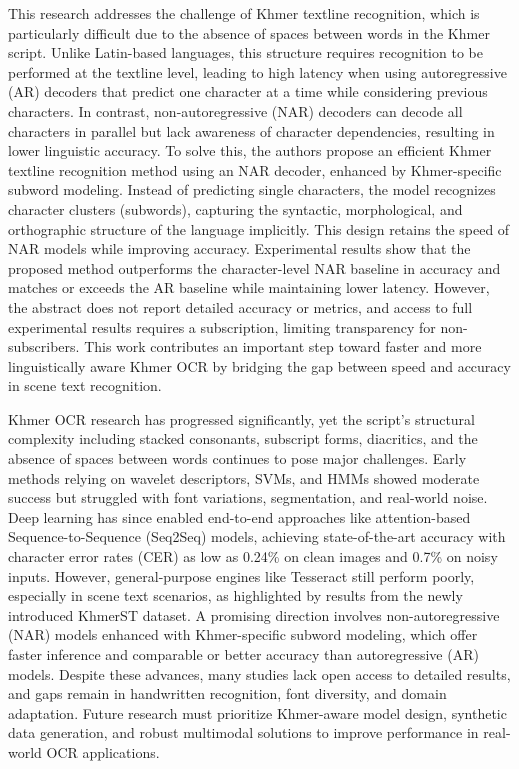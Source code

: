 \citet{Rina2025} This research addresses the challenge of Khmer textline recognition, 
which is particularly difficult due to the absence of spaces between words in the Khmer script. 
Unlike Latin-based languages, this structure requires recognition to be performed at the textline level, 
leading to high latency when using autoregressive (AR) decoders that predict one character at a 
time while considering previous characters. In contrast, non-autoregressive (NAR) decoders can decode 
all characters in parallel but lack awareness of character dependencies, resulting in lower linguistic 
accuracy. To solve this, the authors propose an efficient Khmer textline recognition method using an NAR 
decoder, enhanced by Khmer-specific subword modeling. Instead of predicting single characters, the model 
recognizes character clusters (subwords), capturing the syntactic, morphological, and orthographic 
structure of the language implicitly. This design retains the speed of NAR models while improving accuracy. 
Experimental results show that the proposed method outperforms the character-level NAR baseline 
in accuracy and matches or exceeds the AR baseline while maintaining lower latency. However, 
the abstract does not report detailed accuracy or metrics, and access to full experimental results 
requires a subscription, limiting transparency for non-subscribers. This work contributes an 
important step toward faster and more linguistically aware Khmer OCR by bridging the gap between 
speed and accuracy in scene text recognition.

Khmer OCR research has progressed significantly, yet the script’s structural complexity including 
stacked consonants, subscript forms, diacritics, and the absence of spaces between words continues 
to pose major challenges. Early methods relying on wavelet descriptors, SVMs, and HMMs showed moderate 
success but struggled with font variations, segmentation, and real-world noise. Deep learning has 
since enabled end-to-end approaches like attention-based Sequence-to-Sequence (Seq2Seq) models, 
achieving state-of-the-art accuracy with character error rates (CER) as low as 0.24\% on clean 
images and 0.7\% on noisy inputs. However, general-purpose engines like Tesseract still perform 
poorly, especially in scene text scenarios, as highlighted by results from the newly introduced 
KhmerST dataset. A promising direction involves non-autoregressive (NAR) models enhanced with 
Khmer-specific subword modeling, which offer faster inference and comparable or better accuracy 
than autoregressive (AR) models. Despite these advances, many studies lack open access to detailed 
results, and gaps remain in handwritten recognition, font diversity, and domain adaptation. 
Future research must prioritize Khmer-aware model design, synthetic data generation, and robust 
multimodal solutions to improve performance in real-world OCR applications.
    


